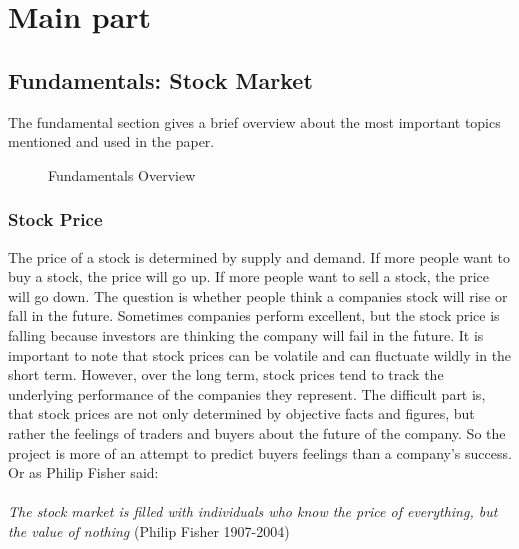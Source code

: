 \clearpage
\section{Main part} \label{sec: Mainpart}
\subsection{Fundamentals: Stock Market}\label{sec: Fundamentals Stock Market}
The fundamental section gives a brief overview about the most important topics mentioned and used in the paper.
\begin{figure}[H]
	\centering
	\caption{Fundamentals Overview}
	\label{fig: fundamentals chart}
\end{figure}
\subsubsection{Stock Price}\label{sec: Stock Price}
The price of a stock is determined by supply and demand. If more people want to buy a stock, the price will go up. If more people want to sell a stock, the price will go down.
The question is whether people think a companies stock will rise or fall in the future. Sometimes companies perform excellent, but the stock price is falling because investors are thinking the company will fail in the future. It is important to note that stock prices can be volatile and can fluctuate wildly in the short term. However, over the long term, stock prices tend to track the underlying performance of the companies they represent. \cite{graham1934intelligent}
The difficult part is, that stock prices are not only determined by objective facts and figures, but rather the feelings of traders and buyers about the future of the company. So the project is more of an attempt to predict buyers feelings than a company's success. Or as Philip Fisher said:\\
\\
\textit{\grqq The stock market is filled with individuals who know the price of everything, but the value of nothing\grqq{}} (Philip Fisher 1907-2004)

